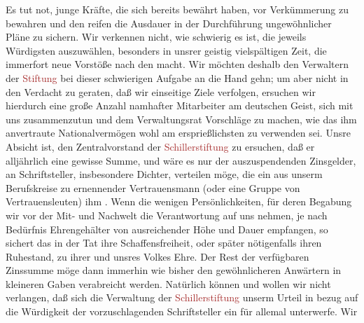                     Es tut not, junge Kräfte, die sich bereits bewährt haben, vor Verkümmerung zu
                    bewahren und den reifen die Ausdauer in der Durchführung ungewöhnlicher Pläne zu
                    sichern.\pend
           \pstart
           Wir verkennen nicht, wie schwierig es ist, die jeweils Würdigsten auszuwählen,
                    besonders in unsrer geistig vielspältigen Zeit, die immerfort neue Vorstöße nach
                    den  macht. Wir möchten
                    deshalb den Verwaltern der \textcolor{brown}{Stiftung}{}
                    bei dieser schwierigen Aufgabe an die Hand gehn; um aber nicht in den Verdacht
                    zu geraten, daß wir einseitige Ziele verfolgen, ersuchen wir hierdurch eine
                    große Anzahl namhafter Mitarbeiter am deutschen Geist, sich mit uns
                    zusammenzutun und dem Verwaltungsrat Vorschläge zu {\pb}machen, wie das ihm anvertraute Nationalvermögen wohl am ersprießlichsten zu
                    verwenden sei.\pend
           \pstart
           Unsre Absicht ist, den Zentralvorstand der \textcolor{brown}{Schillerstiftung}{}\ledrightnote{\textcolor{brown}{Deutsche Schillerstiftung}} zu ersuchen, daß er alljährlich eine gewisse Summe,
                    und wäre es nur  der auszuspendenden
                    Zinsgelder, an  Schriftsteller,
                    insbesondere Dichter, verteilen möge, die ein aus unserm Berufskreise zu
                    ernennender Vertrauensmann (oder eine Gruppe von Vertrauensleuten) ihm . Wenn die wenigen
                    Persönlichkeiten, für deren Begabung wir vor der Mit- und Nachwelt die
                    Verantwortung auf uns nehmen, je nach Bedürfnis Ehrengehälter von ausreichender
                    Höhe und Dauer empfangen, so sichert das in der Tat ihre Schaffensfreiheit, oder
                    später nötigenfalls ihren Ruhestand, zu ihrer und unsres Volkes Ehre. Der Rest
                    der verfügbaren Zinssumme möge dann immerhin wie bisher den gewöhnlicheren
                    Anwärtern in kleineren Gaben verabreicht werden.\pend
           \pstart
           Natürlich können und wollen wir nicht verlangen, daß sich die Verwaltung der \textcolor{brown}{Schillerstiftung}{}\ledrightnote{\textcolor{brown}{Deutsche Schillerstiftung}} unserm Urteil in bezug auf die
                    Würdigkeit der vorzuschlagenden Schriftsteller ein für allemal unterwerfe. Wir
